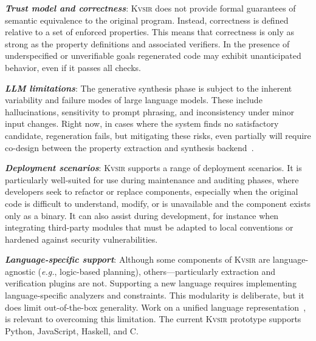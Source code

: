 \documentclass[sigplan,review,anonymous,10pt]{acmart}
\def\eg{{\em e.g.}, }
\newcommand{\sys}{{\scshape Kv{\textalpha}sir}\xspace}
\newcommand{\heading}[1]{\vspace{2pt}\noindent\textbf{\emph{#1}}:\enspace}
\begin{document}
\heading{Trust model and correctness}
\sys
does not provide formal guarantees
of semantic equivalence
to the original program.
Instead,
correctness is defined relative to a set of enforced properties.
This means that correctness is only as strong as the property definitions and associated verifiers.
In the presence of underspecified or unverifiable goals
regenerated code
may exhibit unanticipated behavior,
even if it passes all checks. 

\heading{LLM limitations}
The generative synthesis phase
is subject to the inherent variability and failure modes
of large language models.
These include hallucinations,
sensitivity to prompt phrasing,
and inconsistency
under minor input changes.
Right now, in cases where the system finds no satisfactory candidate, regeneration fails,
but mitigating these risks, even partially will 
require co-design between the property extraction and synthesis backend~\cite{banerjee2025crane}.

\heading{Deployment scenarios}
\sys supports a range of deployment scenarios.
It is particularly well-suited for use during maintenance and auditing phases, where developers seek to refactor or replace components, especially when the original code is difficult to understand, modify, or is unavailable and the component exists only as a binary.
It can also assist during development, for instance when integrating
third-party modules that must be adapted to local conventions or hardened
against security vulnerabilities.

\heading{Language-specific support}
Although some components of \sys are language-agnostic (\eg logic-based planning),
others---particularly extraction and verification plugins are not.
Supporting a new language
requires implementing language-specific analyzers and constraints.
This modularity is deliberate,
but it does limit out-of-the-box generality.
Work on a unified language representation~\cite{koppel2018onetool,bap2011,dillig2009sail},
is relevant to overcoming this limitation.
The current \sys prototype
supports Python, JavaScript, Haskell, and C. 
\end{document}
